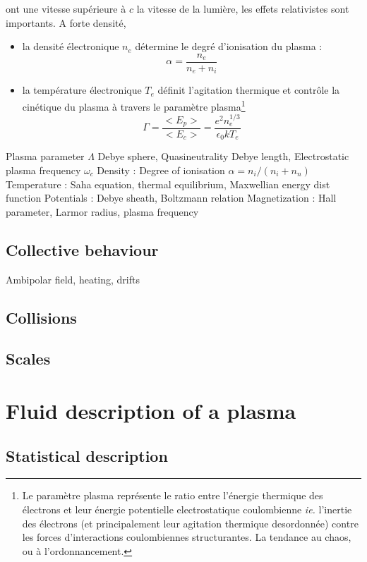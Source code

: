 			ont une vitesse supérieure à $c$ la vitesse de la lumière, les effets
			relativistes sont importants. A forte densité, 
			
		
		
		\begin{itemize}
				\item la densité électronique $n_e$ détermine le degré d'ionisation du plasma :
				$$\alpha=\frac{n_e}{n_e+n_i}$$ 
				\item la température électronique $T_e$ définit
			l'agitation thermique et contrôle la cinétique du plasma à travers le paramètre plasma\footnote{Le paramètre 
			plasma représente le ratio
			entre l'énergie thermique des électrons et leur énergie potentielle electrostatique coulombienne 
			\emph{ie.} l'inertie des électrons (et principalement leur agitation thermique desordonnée) contre les forces
			d'interactions coulombiennes structurantes. La tendance au chaos, ou à l'ordonnancement.}
			$$\Gamma=\frac{<E_p>}{<E_c>}=\frac{e^2n_e^{1/3}}{\epsilon_0 kT_e}$$
			\end{itemize}
			
		 Plasma parameter $\Lambda$ Debye sphere, Quasineutrality Debye length,
		Electrostatic plasma frequency $\omega_c$
		 Density : Degree of ionisation $\alpha=n_i/(n_i+n_n)$
			Temperature : Saha equation, thermal equilibrium, Maxwellian energy dist function
			Potentials : Debye sheath, Boltzmann relation
			Magnetization : Hall parameter, Larmor radius, plasma frequency
		\subsection{Collective behaviour}
			Ambipolar field, heating, drifts
		\subsection{Collisions}
		\subsection{Scales}
		
	\section{Fluid description of a plasma}
		\subsection{Statistical description}
